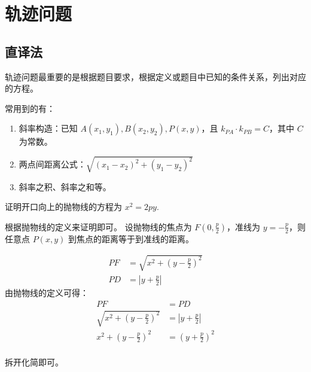 \section{轨迹问题}

\subsection{直译法}

\begin{definition}
    轨迹问题最重要的是根据题目要求，根据定义或题目中已知的条件关系，列出对应的方程。
\end{definition}

\begin{theorem}
    常用到的有：

    \begin{enumerate}
        \item 斜率构造：已知 $A(x_1,y_1), B(x_2,y_2), P(x,y)$，且 $k_{PA} \cdot k_{PB} = C$，其中 $C$ 为常数。
        \item 两点间距离公式：$\sqrt{(x_1-x_2)^2 + (y_1-y_2)^2}$
        \item 斜率之积、斜率之和等。
    \end{enumerate}
\end{theorem}

\begin{example}
    证明开口向上的抛物线的方程为 $x^2 = 2py$.
\end{example}

\begin{solution}
    根据抛物线的定义来证明即可。
    设抛物线的焦点为 $F(0,\frac{p}{2})$，准线为 $y = -\frac{p}{2}$，则任意点 $P(x,y)$ 到焦点的距离等于到准线的距离。

    \begin{align*}
        PF & = \sqrt{x^2 + (y-\frac{p}{2})^2} \\
        PD & = |y + \frac{p}{2}|
    \end{align*}
    由抛物线的定义可得：
    \begin{align*}
        PF                             & = PD                \\
        \sqrt{x^2 + (y-\frac{p}{2})^2} & = |y + \frac{p}{2}| \\
        x^2 + (y-\frac{p}{2})^2        & = (y+\frac{p}{2})^2 \\
    \end{align*}

    拆开化简即可。
\end{solution}

